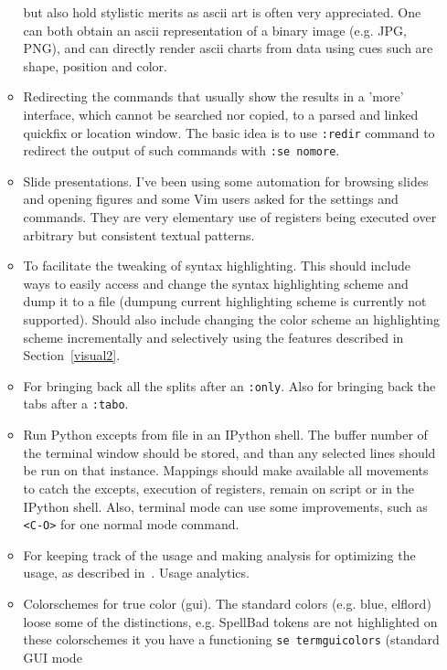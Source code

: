 \documentclass{article}
\newcommand{\ttt}[1] {
	\texttt{<#1>}}
\newcommand{\tttt}[1]{\texttt{#1}}
\begin{document}
\begin{itemize}
\begin{itemize}
        but also hold stylistic merits as ascii art is often
        very appreciated.
        One can both obtain an ascii representation of a binary image (e.g. JPG, PNG),
        and can directly render ascii charts from data using cues such are shape, position
        and color.
      \item Redirecting the commands that usually show the results in a 'more' interface,
        which cannot be searched nor copied,
        to a parsed and linked quickfix or location window.
        The basic idea is to use \tttt{:redir} command to redirect the output
        of such commands with \tttt{:se nomore}.
      \item Slide presentations. I've been using some automation for browsing
        slides and opening figures and some Vim users asked for the settings and
        commands. They are very elementary use of registers being executed over
        arbitrary but consistent textual patterns.
      \item To facilitate the tweaking of syntax highlighting.
        This should include ways to easily access and change the
        syntax highlighting scheme and dump it to a file (dumpung
        current highlighting scheme is currently not supported).
        Should also include changing the color scheme an highlighting scheme incrementally
        and selectively using the features described in Section~\ref{visual2}.
      \item For bringing back all the splits after an \tttt{:only}.
        Also for bringing back the tabs after a \tttt{:tabo}.
      \item Run Python excepts from file in an IPython shell. 
        The buffer number of the terminal window should be stored,
        and than any selected lines should be run on that instance.
        Mappings should make available all movements to catch the excepts,
        execution of registers, remain on script or in the IPython shell.
        Also, terminal mode can use some improvements, such as \ttt{C-O} for
        one normal mode command.
      \item For keeping track of the usage and making analysis
        for optimizing the usage, as described in~\cite{http://www.drbunsen.org/vim-croquet/}. Usage analytics.
      \item Colorschemes for true color (gui).
        The standard colors (e.g. blue, elflord) loose some of the distinctions,
        e.g. SpellBad tokens are not highlighted on these colorschemes
        it you have a functioning \tttt{se termguicolors} (standard GUI mode

\end{itemize}
\end{itemize}
\end{document}
